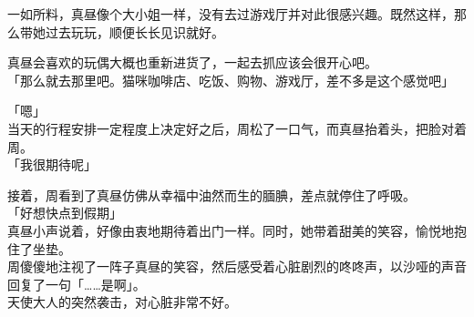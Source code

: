 一如所料，真昼像个大小姐一样，没有去过游戏厅并对此很感兴趣。既然这样，那么带她过去玩玩，顺便长长见识就好。

真昼会喜欢的玩偶大概也重新进货了，一起去抓应该会很开心吧。\\

「那么就去那里吧。猫咪咖啡店、吃饭、购物、游戏厅，差不多是这个感觉吧」

「嗯」\\

当天的行程安排一定程度上决定好之后，周松了一口气，而真昼抬着头，把脸对着周。\\

「我很期待呢」

接着，周看到了真昼仿佛从幸福中油然而生的腼腆，差点就停住了呼吸。\\

「好想快点到假期」\\

真昼小声说着，好像由衷地期待着出门一样。同时，她带着甜美的笑容，愉悦地抱住了坐垫。\\

周傻傻地注视了一阵子真昼的笑容，然后感受着心脏剧烈的咚咚声，以沙哑的声音回复了一句「……是啊」。\\

天使大人的突然袭击，对心脏非常不好。
